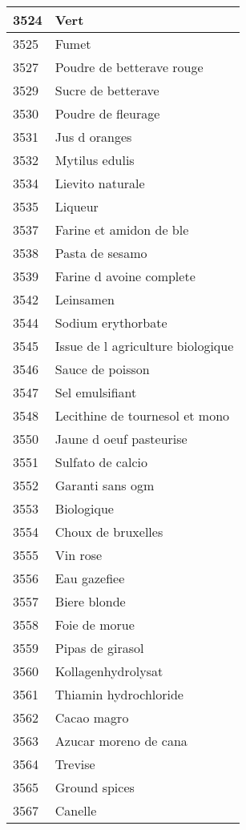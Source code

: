 \begin{longtable}{|l|l|}
3524 & Vert \\ \hline 
3525 & Fumet \\ \hline 
3527 & Poudre de betterave rouge \\ \hline 
3529 & Sucre de betterave \\ \hline 
3530 & Poudre de fleurage \\ \hline 
3531 & Jus d oranges \\ \hline 
3532 & Mytilus edulis \\ \hline 
3534 & Lievito naturale \\ \hline 
3535 & Liqueur \\ \hline 
3537 & Farine et amidon de ble \\ \hline 
3538 & Pasta de sesamo \\ \hline 
3539 & Farine d avoine complete \\ \hline 
3542 & Leinsamen \\ \hline 
3544 & Sodium erythorbate \\ \hline 
3545 & Issue de l agriculture biologique \\ \hline 
3546 & Sauce de poisson \\ \hline 
3547 & Sel emulsifiant \\ \hline 
3548 & Lecithine de tournesol et mono \\ \hline 
3550 & Jaune d oeuf pasteurise \\ \hline 
3551 & Sulfato de calcio \\ \hline 
3552 & Garanti sans ogm \\ \hline 
3553 & Biologique \\ \hline 
3554 & Choux de bruxelles \\ \hline 
3555 & Vin rose \\ \hline 
3556 & Eau gazefiee \\ \hline 
3557 & Biere blonde \\ \hline 
3558 & Foie de morue \\ \hline 
3559 & Pipas de girasol \\ \hline 
3560 & Kollagenhydrolysat \\ \hline 
3561 & Thiamin hydrochloride \\ \hline 
3562 & Cacao magro \\ \hline 
3563 & Azucar moreno de cana \\ \hline 
3564 & Trevise \\ \hline 
3565 & Ground spices \\ \hline 
3567 & Canelle \\ \hline 

\end{longtable}
